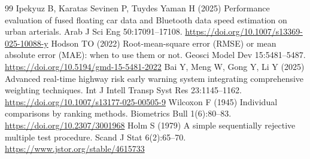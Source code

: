 \documentclass[smallcondensed]{svjour3}
\begin{document}
\begin{thebibliography}{99}
 Ipekyuz B, Karatas Sevinen P, Tuydes Yaman H (2025) Performance evaluation of fused floating car data and Bluetooth data speed estimation on urban arterials. Arab J Sci Eng 50:17091--17108. \url{https://doi.org/10.1007/s13369-025-10088-y}
 Hodson TO (2022) Root-mean-square error (RMSE) or mean absolute error (MAE): when to use them or not. Geosci Model Dev 15:5481--5487. \url{https://doi.org/10.5194/gmd-15-5481-2022}
 Bai Y, Meng W, Gong Y, Li Y (2025) Advanced real-time highway risk early warning system integrating comprehensive weighting techniques. Int J Intell Transp Syst Res 23:1145--1162. \url{https://doi.org/10.1007/s13177-025-00505-9}
 Wilcoxon F (1945) Individual comparisons by ranking methods. Biometrics Bull 1(6):80--83. \url{https://doi.org/10.2307/3001968}
 Holm S (1979) A simple sequentially rejective multiple test procedure. Scand J Stat 6(2):65--70. \url{https://www.jstor.org/stable/4615733}
\end{thebibliography}
\end{document}
